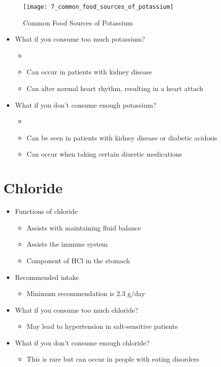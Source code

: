 \documentclass[title={Chapter 7}]{fdsn201notes}
\begin{document}
\begin{figure}[H]
	\centering
	\texttt{[image: 7\_common\_food\_sources\_of\_potassium]}
	\caption{Common Food Sources of Potassium}
	\label{fig:common_food_sources_of_potassium}
\end{figure}

\begin{itemize}
	\item What if you consume too much potassium?
	\begin{itemize}
		\item {}
		\item Can occur in patients with kidney disease
		\item Can alter normal heart rhythm, resulting in a heart attach
	\end{itemize}
	\item What if you don't consume enough potassium?
	\begin{itemize}
		\item {}
		\item Can be seen in patients with kidney disease or diabetic acidosis
		\item Can occur when taking certain diuretic medications
	\end{itemize}
\end{itemize}

\section{Chloride}\label{sec:chloride}
\begin{itemize}
	\item Functions of chloride
	\begin{itemize}
		\item Assists with maintaining fluid balance
		\item Assists the immune system
		\item Component of HCl in the stomach
	\end{itemize}
	\item Recommended intake
	\begin{itemize}
		\item Minimum recommendation is 2.3 g/day
	\end{itemize}
	\item What if you consume too much chloride?
	\begin{itemize}
		\item May lead to hypertension in salt-sensitive patients
	\end{itemize}
	\item What if you don't consume enough chloride?
	\begin{itemize}
		\item This is rare but can occur in people with eating disorders
	\end{itemize}
\end{itemize}
\end{document}
